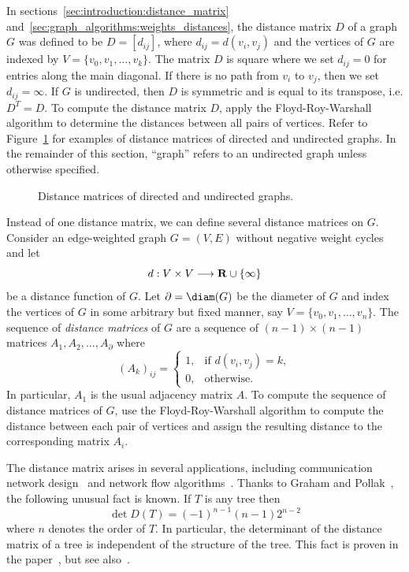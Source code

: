 In sections~\ref{sec:introduction:distance_matrix}
and~\ref{sec:graph_algorithms:weights_distances}, the distance matrix
$D$ of a graph $G$ was defined to be $D = [d_{ij}]$, where
$d_{ij} = d(v_i, v_j)$ and the vertices of $G$ are indexed by
$V = \{v_0, v_1, \dots, v_k\}$. The matrix $D$ is square where we set
$d_{ij} = 0$ for entries along the main diagonal. If there is no path
from $v_i$ to $v_j$, then we set $d_{ij} = \infty$. If $G$ is
undirected, then $D$ is symmetric and is equal to its transpose,
i.e. $D^T = D$. To compute the distance matrix $D$, apply the
Floyd-Roy-Warshall algorithm to
determine the distances between all pairs of vertices. Refer to
Figure~\ref{fig:distance_connectivity:distance_matrix_directed_undirected_graphs}
for examples of distance matrices of directed and undirected
graphs. In the remainder of this section, ``graph'' refers to an
undirected graph unless otherwise specified.

\begin{figure}[!htbp]
\centering
{}

\caption{Distance matrices of directed and undirected graphs.}
\label{fig:distance_connectivity:distance_matrix_directed_undirected_graphs}
\end{figure}

Instead of one distance matrix, we can define several distance
matrices on $G$. Consider an edge-weighted graph $G = (V,E)$ without
negative weight cycles and let
\[
d: V \times V \longrightarrow \mathbf{R} \cup \{\infty\}
\]
be a distance function of $G$. Let $\partial = \diam(G)$ be the
diameter of $G$ and index the vertices of $G$ in some arbitrary but
fixed manner, say $V = \{v_0, v_1, \dots, v_n\}$. The sequence of
\emph{distance matrices} of $G$ are a sequence
of $(n - 1) \times (n - 1)$ matrices $A_1, A_2, \dots, A_\partial$ where
\[
(A_k)_{ij}
=
\begin{cases}
1, & \text{if $d(v_i, v_j) = k$}, \\
0, & \text{otherwise}.
\end{cases}
\]
In particular, $A_1$ is the usual adjacency matrix $A$. To compute the
sequence of distance matrices of $G$, use the
Floyd-Roy-Warshall algorithm to
compute the distance between each pair of vertices and assign the
resulting distance to the corresponding matrix $A_i$.

The distance matrix arises in several applications, including
communication network design~\cite{GrahamPollak1971} and network flow
algorithms~\cite{Dijkstra1959}. Thanks to
Graham and
Pollak~\cite{GrahamPollak1971}, the following
unusual fact is known. If $T$ is any tree then
\[
\det D(T)
=
(-1)^{n - 1} (n - 1) 2^{n - 2}
\]
where $n$ denotes the order of $T$. In particular, the determinant of
the distance matrix of a tree is independent of the structure of the
tree.  This fact is proven in the paper~\cite{GrahamPollak1971}, but
see also~\cite{EdelbergEtAl1976}.


